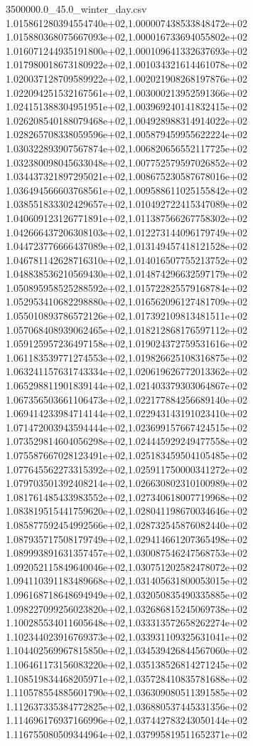 \begin{filecontents*}{3500000.0_45.0_winter_day.csv}
1.015861280394554740e+02,1.000007438533848472e+02
1.015880368075667093e+02,1.000016733694055802e+02
1.016071244935191800e+02,1.000109641332637693e+02
1.017980018673180922e+02,1.001034321614461078e+02
1.020037128709589922e+02,1.002021908268197876e+02
1.022094251532167561e+02,1.003000213952591366e+02
1.024151388304951951e+02,1.003969240141832415e+02
1.026208540188079468e+02,1.004928988314914022e+02
1.028265708338059596e+02,1.005879459955622224e+02
1.030322893907567874e+02,1.006820656552117725e+02
1.032380098045633048e+02,1.007752579597026852e+02
1.034437321897295021e+02,1.008675230587678016e+02
1.036494566603768561e+02,1.009588611025155842e+02
1.038551833302429657e+02,1.010492722415347089e+02
1.040609123126771891e+02,1.011387566267758302e+02
1.042666437206308103e+02,1.012273144096179749e+02
1.044723776666437089e+02,1.013149457418121528e+02
1.046781142628716310e+02,1.014016507755213752e+02
1.048838536210569430e+02,1.014874296632597179e+02
1.050895958525288592e+02,1.015722825579168784e+02
1.052953410682298880e+02,1.016562096127481709e+02
1.055010893786572126e+02,1.017392109813481511e+02
1.057068408939062465e+02,1.018212868176597112e+02
1.059125957236497158e+02,1.019024372759531616e+02
1.061183539771274553e+02,1.019826625108316875e+02
1.063241157631743334e+02,1.020619626772013362e+02
1.065298811901839144e+02,1.021403379303064867e+02
1.067356503661106473e+02,1.022177884256689140e+02
1.069414233984714144e+02,1.022943143191023410e+02
1.071472003943594444e+02,1.023699157667424515e+02
1.073529814604056298e+02,1.024445929249477558e+02
1.075587667028123491e+02,1.025183459504105485e+02
1.077645562273315392e+02,1.025911750000341272e+02
1.079703501392408214e+02,1.026630802310100989e+02
1.081761485433983552e+02,1.027340618007719968e+02
1.083819515441759620e+02,1.028041198670034646e+02
1.085877592454992566e+02,1.028732545876082440e+02
1.087935717508179749e+02,1.029414661207365498e+02
1.089993891631357457e+02,1.030087546247568753e+02
1.092052115849640046e+02,1.030751202582478072e+02
1.094110391183489668e+02,1.031405631800053015e+02
1.096168718648694949e+02,1.032050835490335885e+02
1.098227099256023820e+02,1.032686815245069738e+02
1.100285534011605648e+02,1.033313572658262274e+02
1.102344023916769373e+02,1.033931109325631041e+02
1.104402569967815850e+02,1.034539426844567060e+02
1.106461173156083220e+02,1.035138526814271245e+02
1.108519834468205971e+02,1.035728410835781688e+02
1.110578554885601790e+02,1.036309080511391585e+02
1.112637335384772825e+02,1.036880537445331356e+02
1.114696176937166996e+02,1.037442783243050144e+02
1.116755080509344964e+02,1.037995819511652371e+02

\end{filecontents*}
